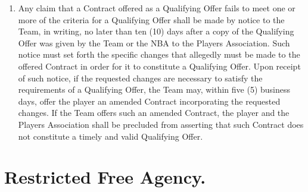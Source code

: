\documentclass[
]{book}
\begin{document}
\begin{enumerate}
\item
  Any claim that a Contract offered as a Qualifying Offer fails to meet one or more of the criteria for a Qualifying Offer shall be made by notice to the Team, in writing, no later than ten (10) days after a copy of the Qualifying Offer was given by the Team or the NBA to the Players Association. Such notice must set forth the specific changes that allegedly must be made to the offered Contract in order for it to constitute a Qualifying Offer. Upon receipt of such notice, if the requested changes are necessary to satisfy the requirements of a Qualifying Offer, the Team may, within five (5) business days, offer the player an amended Contract incorporating the requested changes. If the Team offers such an amended Contract, the player and the Players Association shall be precluded from asserting that such Contract does not constitute a timely and valid Qualifying Offer.
\end{enumerate}

\hypertarget{restricted-free-agency.}{%
\section{Restricted Free Agency.}\label{restricted-free-agency.}}
\end{document}
